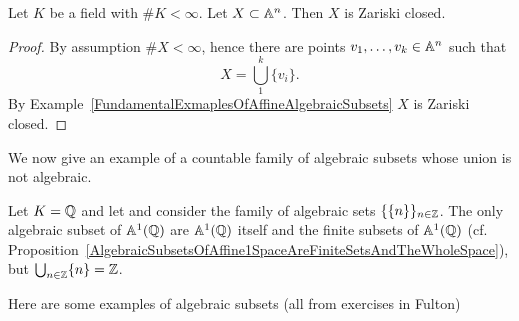 \begin{corollary}\label{EverySubsetOfFiniteAffineSpaceIsAlgebraic}
    Let $K$ be a field with $\# K <\infty$. Let $X\subset \mathbb{A}^n$. Then $X$ is Zariski closed. 
\end{corollary}
\begin{proof}
    By assumption $\#X < \infty$, hence there are points $v_1,\dots,v_k\in \mathbb{A}^n$ such that 
    $$X = \bigcup_1^k \{v_i\}.$$
    By Example~\ref{FundamentalExmaplesOfAffineAlgebraicSubsets} $X$ is Zariski closed. 
\end{proof}
We now give an example of a countable family of algebraic subsets whose union is not algebraic. 
\begin{example}\label{ExampleOfCountableUnionOfAlgebraicSubsetsWhichIsNotAlgebraic}
    Let $K=\mathbb{Q}$ and let and consider the family of algebraic sets $\{ \{n\}\}_{n\in \mathbb{Z}}$. The only algebraic subset of $\mathbb{A}^1(\mathbb{Q})$ are $\mathbb{A}^1(\mathbb{Q})$ itself and the finite subsets of $\mathbb{A}^1(\mathbb{Q})$ (cf. Proposition~\ref{AlgebraicSubsetsOfAffine1SpaceAreFiniteSetsAndTheWholeSpace}), but $\bigcup_{n\in \mathbb{Z}} \{n\} = \mathbb{Z}$. 
\end{example}
Here are some examples of algebraic subsets (all from exercises in Fulton)
